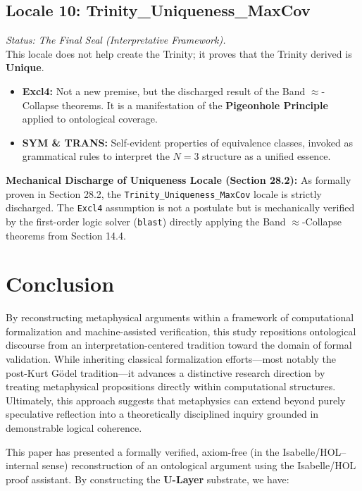 \documentclass[a4paper, 11pt]{article}
\theoremstyle{plain}
\theoremstyle{definition}
\begin{document}
\subsection{Locale 10: Trinity\_Uniqueness\_MaxCov}
\textit{Status: The Final Seal (Interpretative Framework).} \\
This locale does not help create the Trinity; it proves that the Trinity derived is \textbf{Unique}.
\begin{itemize}
    \item \textbf{Excl4:} Not a new premise, but the discharged result of the Band $\approx$-Collapse theorems. It is a manifestation of the \textbf{Pigeonhole Principle} applied to ontological coverage.
    \item \textbf{SYM \& TRANS:} Self-evident properties of equivalence classes, invoked as grammatical rules to interpret the $N=3$ structure as a unified essence.
\end{itemize}

\vspace{0.5em}
\noindent \textbf{Mechanical Discharge of Uniqueness Locale (Section 28.2):}
As formally proven in Section 28.2, the \texttt{Trinity\_Uniqueness\_MaxCov} locale is strictly discharged. The \texttt{Excl4} assumption is not a postulate but is mechanically verified by the first-order logic solver (\texttt{blast}) directly applying the Band $\approx$-Collapse theorems from Section 14.4.

\section{Conclusion}
\label{sec:conclusion}

By reconstructing metaphysical arguments within a framework of computational formalization and machine-assisted verification, this study repositions ontological discourse from an interpretation-centered tradition toward the domain of formal validation. While inheriting classical formalization efforts—most notably the post-Kurt G\"odel tradition—it advances a distinctive research direction by treating metaphysical propositions directly within computational structures. Ultimately, this approach suggests that metaphysics can extend beyond purely speculative reflection into a theoretically disciplined inquiry grounded in demonstrable logical coherence.

This paper has presented a formally verified, axiom-free (in the Isabelle/HOL--internal sense) reconstruction of an ontological argument using the Isabelle/HOL proof assistant. By constructing the \textbf{U-Layer} substrate, we have:
\end{document}
